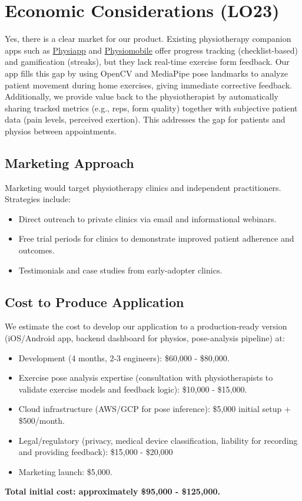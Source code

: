 \documentclass{article}
\begin{document}
\section{Economic Considerations (LO23)}

Yes, there is a clear market for our product. Existing physiotherapy companion apps such as \href{https://www.physiapp.com/}{Physiapp} and \href{https://apps.apple.com/ca/app/physiomobile-physio-rehab/id6749616813}{Physiomobile} offer progress tracking (checklist-based) and gamification (streaks), but they lack real-time exercise form feedback. Our app fills this gap by using OpenCV and MediaPipe pose landmarks to analyze patient movement during home exercises, giving immediate corrective feedback. Additionally, we provide value back to the physiotherapist by automatically sharing tracked metrics (e.g., reps, form quality) together with subjective patient data (pain levels, perceived exertion). This addresses the gap for patients and physios between appointments.

\subsection*{Marketing Approach}
Marketing would target physiotherapy clinics and independent practitioners. Strategies include:
\begin{itemize}
    \item Direct outreach to private clinics via email and informational webinars.
    \item Free trial periods for clinics to demonstrate improved patient adherence and outcomes.
    \item Testimonials and case studies from early-adopter clinics.
\end{itemize}

\subsection*{Cost to Produce Application}
We estimate the cost to develop our application to a production-ready version (iOS/Android app, backend dashboard for physios, pose-analysis pipeline) at:
\begin{itemize}
    \item Development (4 months, 2-3 engineers): \$60,000 - \$80,000.
    \item Exercise pose analysis expertise (consultation with physiotherapists to validate exercise models and feedback logic): \$10,000 - \$15,000.
    \item Cloud infrastructure (AWS/GCP for pose inference): \$5,000 initial setup + \$500/month.
    \item Legal/regulatory (privacy, medical device classification, liability for recording and providing feedback): \$15,000 - \$20,000
    \item Marketing launch: \$5,000.
\end{itemize}
\textbf{Total initial cost: approximately \$95,000 - \$125,000.}
\end{document}
